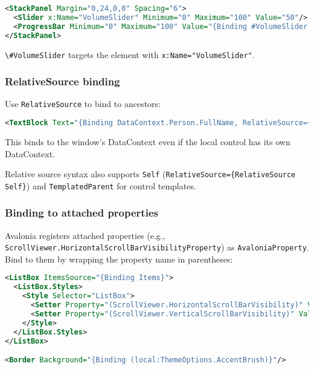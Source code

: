 \begin{lstlisting}[language=XML]
<StackPanel Margin="0,24,0,0" Spacing="6">
  <Slider x:Name="VolumeSlider" Minimum="0" Maximum="100" Value="50"/>
  <ProgressBar Minimum="0" Maximum="100" Value="{Binding #VolumeSlider.Value}"/>
</StackPanel>
\end{lstlisting}

\passthrough{\lstinline!\#VolumeSlider!} targets the element with
\passthrough{\lstinline!x:Name="VolumeSlider"!}.

\subsubsection{RelativeSource binding}\label{relativesource-binding}

Use \passthrough{\lstinline!RelativeSource!} to bind to ancestors:

\begin{lstlisting}[language=XML]
<TextBlock Text="{Binding DataContext.Person.FullName, RelativeSource={RelativeSource AncestorType=Window}}"/>
\end{lstlisting}

This binds to the window's DataContext even if the local control has its
own DataContext.

Relative source syntax also supports \passthrough{\lstinline!Self!}
(\passthrough{\lstinline!RelativeSource=\{RelativeSource Self\}!}) and
\passthrough{\lstinline!TemplatedParent!} for control templates.

\subsubsection{Binding to attached
properties}\label{binding-to-attached-properties}

Avalonia registers attached properties (e.g.,
\passthrough{\lstinline!ScrollViewer.HorizontalScrollBarVisibilityProperty!})
as \passthrough{\lstinline!AvaloniaProperty!}. Bind to them by wrapping
the property name in parentheses:

\begin{lstlisting}[language=XML]
<ListBox ItemsSource="{Binding Items}">
  <ListBox.Styles>
    <Style Selector="ListBox">
      <Setter Property="(ScrollViewer.HorizontalScrollBarVisibility)" Value="Disabled"/>
      <Setter Property="(ScrollViewer.VerticalScrollBarVisibility)" Value="Auto"/>
    </Style>
  </ListBox.Styles>
</ListBox>

<Border Background="{Binding (local:ThemeOptions.AccentBrush)}"/>
\end{lstlisting}

